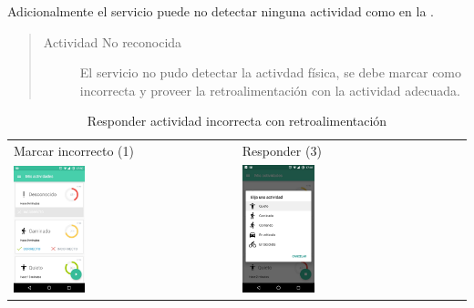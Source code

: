 {Adicionalmente el servicio puede no detectar ninguna actividad como en la .
\begin{quote}
\begin{description}
\item[{Actividad No reconocida}] \leavevmode
El servicio no pudo detectar la activdad física, se debe marcar como incorrecta y proveer la retroalimentación
con la actividad adecuada.

\end{description}
\end{quote}

\begin{table}[!h]
\begin{tabular}{ll}
\textsf{\relax 
Marcar incorrecto (1)
} & \textsf{\relax 
Responder (3)
}\\
    {\includegraphics[width=0.33\textwidth]{anexos/graphics/act_nook_unk.jpg}}
 & 
    {\includegraphics[width=0.33\textwidth]{anexos/graphics/act_feed.jpg}}
\\
\end{tabular}
    \caption{Responder actividad incorrecta con retroalimentación}\label{contrib:actfeed}
\end{table}


}
